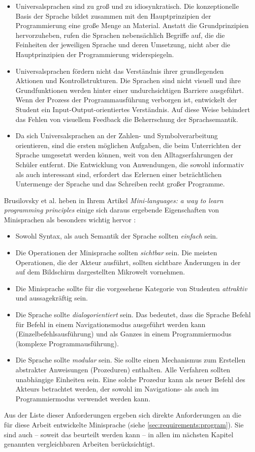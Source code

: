 \begin{itemize}
    \item Universalsprachen sind zu groß und zu idiosynkratisch. Die konzeptionelle Basis der Sprache bildet zusammen mit den Hauptprinzipien der Programmierung eine große Menge an Material. Anstatt die Grundprinzipien hervorzuheben, rufen die Sprachen nebensächlich Begriffe auf, die die Feinheiten der jeweiligen Sprache und deren Umsetzung, nicht aber die Hauptprinzipien der Programmierung widerspiegeln.
    \item Universalsprachen fördern nicht das Verständnis ihrer grundlegenden Aktionen und Kontrollstrukturen. Die Sprachen sind nicht visuell und ihre Grundfunktionen werden hinter einer undurchsichtigen Barriere ausgeführt. Wenn der Prozess der Programmausführung verborgen ist, entwickelt der Student ein Input-Output-orientiertes Verständnis. Auf diese Weise behindert das Fehlen von visuellem Feedback die Beherrschung der Sprachsemantik.
    \item Da sich Universalsprachen an der Zahlen- und Symbolverarbeitung orientieren, sind die ersten möglichen Aufgaben, die beim Unterrichten der Sprache umgesetzt werden können, weit von den Alltagserfahrungen der Schüler entfernt. Die Entwicklung von Anwendungen, die sowohl informativ als auch interessant sind, erfordert das Erlernen einer beträchtlichen Untermenge der Sprache und das Schreiben recht großer Programme.
\end{itemize}

Brusilovsky et al. heben in Ihrem Artikel \textit{Mini-languages: a way to learn programming principles} einige sich daraus ergebende Eigenschaften von Minisprachen als besonders wichtig hervor \cite[73-74]{brusilovsky1997}:

\begin{itemize}
    \item Sowohl Syntax, als auch Semantik der Sprache sollten \emph{einfach} sein.
    \item Die Operationen der Minisprache sollten \emph{sichtbar} sein. Die meisten Operationen, die der Akteur ausführt, sollten sichtbare Änderungen in der auf dem Bildschirm dargestellten Mikrowelt vornehmen.
    \item Die Minisprache sollte für die vorgesehene Kategorie von Studenten \emph{attraktiv} und aussagekräftig sein.
    \item Die Sprache sollte \emph{dialogorientiert} sein. Das bedeutet, dass die Sprache Befehl für Befehl in einem Navigationsmodus ausgeführt werden kann (Einzelbefehlsausführung) und als Ganzes in einem Programmiermodus (komplexe Programmausführung).
    \item Die Sprache sollte \emph{modular} sein. Sie sollte einen Mechanismus zum Erstellen abstrakter Anweisungen (Prozeduren) enthalten. Alle Verfahren sollten unabhängige Einheiten sein. Eine solche Prozedur kann als neuer Befehl des Akteurs betrachtet werden, der sowohl im Navigations- als auch im Programmiermodus verwendet werden kann.
\end{itemize}

Aus der Liste dieser Anforderungen ergeben sich direkte Anforderungen an die für diese Arbeit entwickelte Minisprache (siehe \ref{sec:requirements:program}). Sie sind auch -- soweit das beurteilt werden kann -- in allen im nächsten Kapitel genannten vergleichbaren Arbeiten berücksichtigt.
